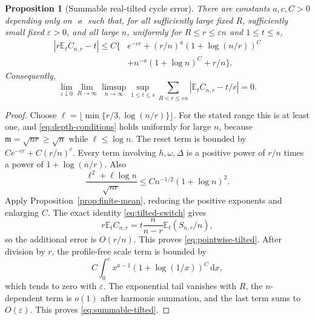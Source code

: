 \documentclass[11pt]{article}
\numberwithin{equation}{section}
\newtheorem{proposition}[theorem]{Proposition}
\theoremstyle{definition}
\theoremstyle{remark}
\newcommand{\E}{\mathbb E}
\newcommand{\dd}{\,\mathrm d}
\newcommand{\eps}{\varepsilon}
\newcommand{\mres}{\mathfrak m}
\newcommand{\abs}[1]{\left|#1\right|}
\begin{document}
\begin{proposition}[Summable real-tilted cycle error]\label{prop:summable}
There are constants $a,c,C>0$ depending only on $\varkappa$ such that, for all sufficiently large fixed $R$, sufficiently small fixed $\eps>0$, and all large $n$, uniformly for $R\le r\le\eps n$ and $1\le t\le s$,
\begin{equation}\label{eq:pointwise-tilted}
 \begin{split}
 |r\E_tC_{n,r}-t|\le C\bigg\{&e^{-cr}
 +(r/n)^a(1+\log(n/r))^C\\
 &+n^{-a}(1+\log n)^C+r/n\bigg\}.
 \end{split}
\end{equation}
Consequently,
\begin{equation}\label{eq:summable-tilted}
 \lim_{\eps\downarrow0}\lim_{R\to\infty}\limsup_{n\to\infty}
 \sup_{1\le t\le s}\sum_{R<r\le\eps n}
 \abs{\E_tC_{n,r}-t/r}=0.
\end{equation}
\end{proposition}
\begin{proof}
Choose $\ell=\lfloor\min\{r/3,\log(n/r)\}\rfloor$. For the stated range this is at least one, and \eqref{eq:depth-conditions} holds uniformly for large $n$, because $\mres=\sqrt{nr}\ge\sqrt n$ while $\ell\le\log n$. The reset term is bounded by $Ce^{-cr}+C(r/n)^c$. Every term involving $h,\omega,\Delta$ is a positive power of $r/n$ times a power of $1+\log(n/r)$. Also
\[
 \frac{\ell^2+\ell\log n}{\sqrt{nr}}
 \le Cn^{-1/2}(1+\log n)^2.
\]
Apply Proposition~\ref{prop:finite-mean}, reducing the positive exponents and enlarging $C$. The exact identity \eqref{eq:tilted-switch} gives
\[
 r\E_tC_{n,r}=t\frac n{n-r}\E_t(S_{n,r}/n),
\]
so the additional error is $O(r/n)$. This proves \eqref{eq:pointwise-tilted}.
After division by $r$, the profile-free scale term is bounded by
\[
 C\int_0^\eps x^{a-1}(1+\log(1/x))^C\dd x,
\]
which tends to zero with $\eps$. The exponential tail vanishes with $R$, the $n$-dependent term is $o(1)$ after harmonic summation, and the last term sums to $O(\eps)$. This proves \eqref{eq:summable-tilted}.
\end{proof}
\end{document}
